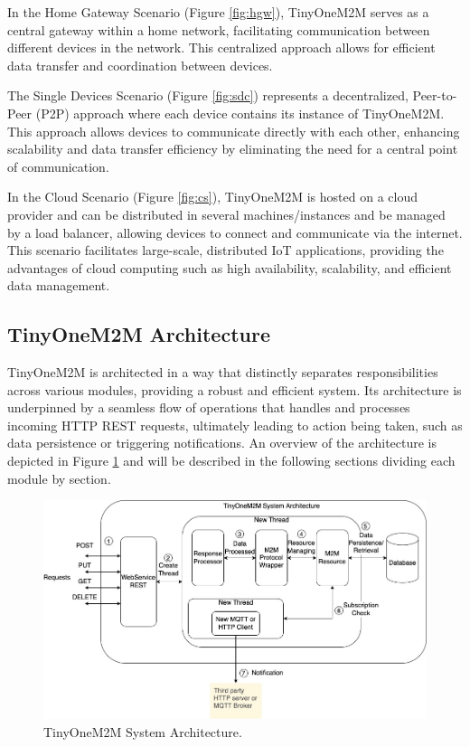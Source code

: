 \documentclass[a4paper,fleqn]{cas-dc}
\begin{document}
In the Home Gateway Scenario (Figure \ref{fig:hgw}), TinyOneM2M serves as a central gateway within a home network, facilitating communication between different devices in the network. This centralized approach allows for efficient data transfer and coordination between devices.

The Single Devices Scenario (Figure \ref{fig:sdc}) represents a decentralized, Peer-to-Peer (P2P) approach where each device contains its instance of TinyOneM2M. This approach allows devices to communicate directly with each other, enhancing scalability and data transfer efficiency by eliminating the need for a central point of communication.

In the Cloud Scenario (Figure \ref{fig:cs}), TinyOneM2M is hosted on a cloud provider and can be distributed in several machines/instances and be managed by a load balancer, allowing devices to connect and communicate via the internet. This scenario facilitates large-scale, distributed IoT applications, providing the advantages of cloud computing such as high availability, scalability, and efficient data management.

\subsection{TinyOneM2M Architecture}

TinyOneM2M is architected in a way that distinctly separates responsibilities across various modules, providing a robust and efficient system. Its architecture is underpinned by a seamless flow of operations that handles and processes incoming HTTP REST requests, ultimately leading to action being taken, such as data persistence or triggering notifications. An overview of the architecture is depicted in Figure \ref{fig:TinyOneM2Mchitecture} and will be described in the following sections dividing each module by section.

\begin{figure}[htbp]
	\centering
	\includegraphics[width=\linewidth]{SolutionArchitecture.jpg}
	\caption{TinyOneM2M System Architecture.}
	\label{fig:TinyOneM2Mchitecture}
\end{figure}
\end{document}
